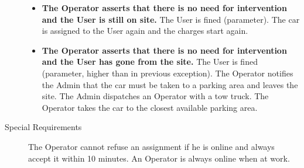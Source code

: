 \begin{description}
\begin{itemize}
				\item \textbf{The Operator asserts that there is no need for intervention and the User is still on site.} The User is fined (parameter). The car is assigned to the User again and the charges start again.
				\item \textbf{The Operator asserts that there is no need for intervention and the User has gone from the site.} The User is fined (parameter, higher than in previous exception). The Operator notifies the Admin that the car must be taken to a parking area and leaves the site. The Admin dispatches an Operator with a tow truck. The Operator takes the car to the closest available parking area.
			\end{itemize}
			\item[Special Requirements] The Operator cannot refuse an assignment if he is online and always accept it within 10 minutes. An Operator is always online when at work. %
		\end{description}

